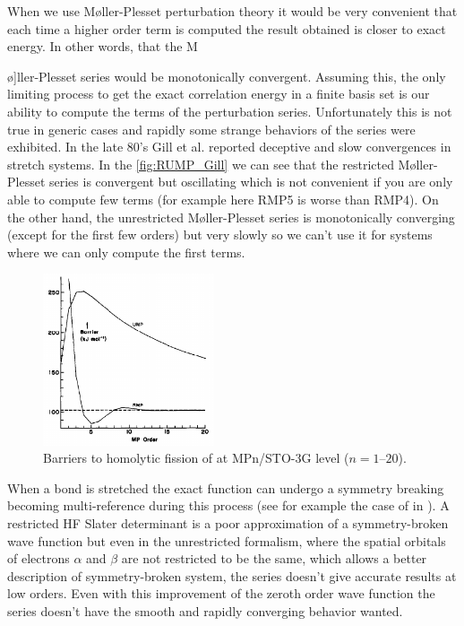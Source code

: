 \documentclass[11pt,a4paper]{article}
\begin{document}
When we use M{\o}ller-Plesset perturbation theory it would be very convenient that each time a higher order term is computed the result obtained is closer to exact energy. In other words, that the M{\o]ller-Plesset series would be monotonically convergent. Assuming this, the only limiting process to get the exact correlation energy in a finite basis set is our ability to compute the terms of the perturbation series.
Unfortunately this is not true in generic cases and rapidly some strange behaviors of the series were exhibited. In the late 80's Gill et al. reported deceptive and slow convergences in stretch systems\cite{Gill_1986, Gill_1988, Handy_1985, Lepetit_1988}. In the \autoref{fig:RUMP_Gill} we can see that the restricted M{\o}ller-Plesset series is convergent but oscillating which is not convenient if you are only able to compute few terms (for example here RMP5 is worse than RMP4). On the other hand, the unrestricted M{\o}ller-Plesset series is monotonically converging (except for the first few orders) but very slowly so we can't use it for systems where we can only compute the first terms.

\begin{figure}[h!]
    \centering
    \includegraphics[width=0.45\textwidth]{gill1986.png}
    \caption{\centering Barriers to homolytic fission of  at MPn/STO-3G level ($n = 1$--$20$)\cite{Gill_1986}.}
    \label{fig:RUMP_Gill}
\end{figure}

When a bond is stretched the exact function can undergo a symmetry breaking becoming multi-reference during this process (see for example the case of  in \cite{SzaboBook}). A restricted HF Slater determinant is a poor approximation of a symmetry-broken wave function but even in the unrestricted formalism, where the spatial orbitals of electrons $\alpha$ and $\beta$ are not restricted to be the same\cite{Fukutome_1981}, which allows a better description of symmetry-broken system, the series doesn't give accurate results at low orders. Even with this improvement of the zeroth order wave function the series doesn't have the smooth and rapidly converging behavior wanted. 

}
\end{document}
